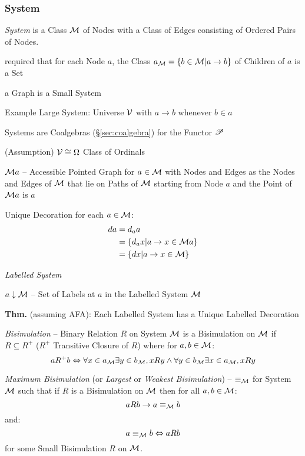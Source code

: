 \subsubsection{System}\label{sec:system}
\cite{aczel88}

\emph{System} is a Class $\mathcal{M}$ of Nodes with a Class of Edges
consisting of Ordered Pairs of Nodes.

required that for each Node $a$, the Class $a_\mathcal{M} = \{b \in
\mathcal{M} | a \to b\}$ of Children of $a$ is a Set

a Graph is a Small System

Example Large System: Universe $\mathcal{V}$ with $a \to b$
whenever $b \in a$

Systems are Coalgebras (\S\ref{sec:coalgebra}) for the Functor $\mathscr{P}$

(Assumption) $\mathcal{V} \cong \Omega$ Class of Ordinals

$\mathcal{M} a$ -- Accessible Pointed Graph for $a \in \mathcal{M}$ with
Nodes and Edges as the Nodes and Edges of $\mathcal{M}$ that lie on
Paths of $\mathcal{M}$ starting from Node $a$ and the Point of
$\mathcal{M} a$ is $a$

Unique Decoration for each $a \in \mathcal{M}$:
\begin{align*}
  d a &= d_a a \\
      &= \{d_a x | a \to x \in \mathcal{M} a\} \\
      &= \{d x | a \to x \in \mathcal{M}\}
\end{align*}

\emph{Labelled System}

$a \downarrow \mathcal{M}$ -- Set of Labels at $a$ in the Labelled
System $\mathcal{M}$

\textbf{Thm.} (assuming AFA): Each Labelled System has a Unique
Labelled Decoration

\emph{Bisimulation} -- Binary Relation $R$ on System $\mathcal{M}$ is a
Bisimulation on $\mathcal{M}$ if $R \subseteq R^+$ ($R^+$ Transitive
Closure of $R$) where for $a,b \in \mathcal{M}$:
\[
  a R^+ b \Leftrightarrow \forall x \in a_\mathcal{M}
    \exists y \in b_\mathcal{M}, x R y \wedge
    \forall y \in b_\mathcal{M} \exists x \in a_\mathcal{M}, x R y
\]

\emph{Maximum Bisimulation} (or \emph{Largest} or \emph{Weakest
  Bisimulation}) -- $\equiv_\mathcal{M}$ for System $\mathcal{M}$ such
that if $R$ is a Bisimulation on $\mathcal{M}$ then for all $a,b \in
\mathcal{M}$:
\[
  a R b \to a \equiv_\mathcal{M} b
\]
and:
\[
  a \equiv_\mathcal{M} b \Leftrightarrow a R b
\]
for some Small Bisimulation $R$ on $\mathcal{M}$.

